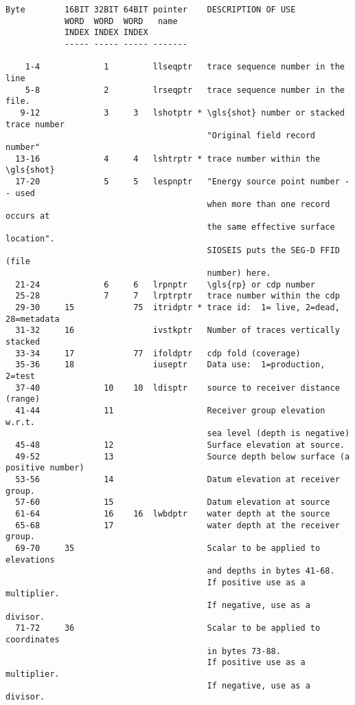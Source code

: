 \begin{verbatim}
Byte        16BIT 32BIT 64BIT pointer    DESCRIPTION OF USE
            WORD  WORD  WORD   name
            INDEX INDEX INDEX
            ----- ----- ----- -------

    1-4             1         llseqptr   trace sequence number in the line
    5-8             2         lrseqptr   trace sequence number in the file.
   9-12             3     3   lshotptr * \gls{shot} number or stacked trace number
                                         "Original field record number"
  13-16             4     4   lshtrptr * trace number within the \gls{shot}
  17-20             5     5   lespnptr   "Energy source point number -- used
                                         when more than one record occurs at
                                         the same effective surface location".
                                         SIOSEIS puts the SEG-D FFID (file
                                         number) here.
  21-24             6     6   lrpnptr    \gls{rp} or cdp number
  25-28             7     7   lrptrptr   trace number within the cdp
  29-30     15            75  itridptr * trace id:  1= live, 2=dead, 28=metadata
  31-32     16                ivstkptr   Number of traces vertically stacked
  33-34     17            77  ifoldptr   cdp fold (coverage)
  35-36     18                iuseptr    Data use:  1=production, 2=test
  37-40             10    10  ldisptr    source to receiver distance (range)
  41-44             11                   Receiver group elevation w.r.t.
                                         sea level (depth is negative)
  45-48             12                   Surface elevation at source.
  49-52             13                   Source depth below surface (a positive number)
  53-56             14                   Datum elevation at receiver group.
  57-60             15                   Datum elevation at source
  61-64             16    16  lwbdptr    water depth at the source
  65-68             17                   water depth at the receiver group.
  69-70     35                           Scalar to be applied to elevations
                                         and depths in bytes 41-68.
                                         If positive use as a multiplier.
                                         If negative, use as a divisor.
  71-72     36                           Scalar to be applied to coordinates
                                         in bytes 73-88.
                                         If positive use as a multiplier.
                                         If negative, use as a divisor.

\end{verbatim}
